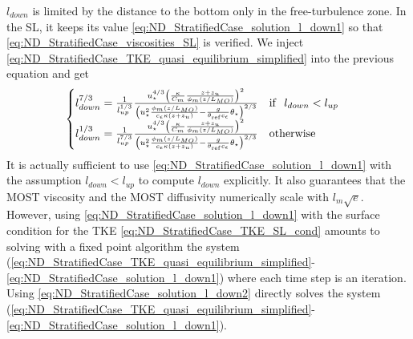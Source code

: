 $l_{down}$ is limited by the distance to the bottom only
in the free-turbulence zone. In the SL, it keeps its value
\eqref{eq:ND_StratifiedCase_solution_l_down1}
so that \eqref{eq:ND_StratifiedCase_viscosities_SL} is
verified.
We inject \eqref{eq:ND_StratifiedCase_TKE_quasi_equilibrium_simplified}
into the previous equation and get
\begin{equation}
	\label{eq:ND_StratifiedCase_solution_l_down2}
	\begin{cases}
	l_{down}^{7/3} = \frac{1}{l_{up}^{1/3}}
		\frac{u_\star^{4/3}\left(
	\frac{\kappa}{C_m}
	\frac{z + z_{u}}{\phi_m(z/L_{MO})}
	\right)^2}{
	\left({u}_\star^2
	\frac{\phi_m(z/L_{MO})}{c_\epsilon\kappa (z+z_{u})}
	- \frac{g}{\theta_{\rm ref}c_\epsilon}\theta_\star
	\right)^{2/3}} ~~~ {\rm if } ~~l_{down} < l_{up}\\
	l_{down}^{1/3} = \frac{1}{l_{up}^{7/3}}
		\frac{u_\star^{4/3}\left(
	\frac{\kappa}{C_m}
	\frac{z + z_{u}}{\phi_m(z/L_{MO})}
	\right)^2}{
	\left({u}_\star^2
	\frac{\phi_m(z/L_{MO})}{c_\epsilon\kappa (z+z_{u})}
	- \frac{g}{\theta_{\rm ref}c_\epsilon}\theta_\star
	\right)^{2/3}} ~~~ {\rm otherwise}\\
	\end{cases}
\end{equation}
It is actually sufficient to use
\eqref{eq:ND_StratifiedCase_solution_l_down1} with
the assumption $l_{down} < l_{up}$
to compute $l_{down}$ explicitly. It also guarantees that
the MOST viscosity and the MOST diffusivity numerically
scale with $l_m\sqrt{e}$.
However, using \eqref{eq:ND_StratifiedCase_solution_l_down1}
with the surface condition for the TKE
\eqref{eq:ND_StratifiedCase_TKE_SL_cond}
amounts to solving with a fixed point algorithm
the system
(\ref{eq:ND_StratifiedCase_TKE_quasi_equilibrium_simplified}-
\ref{eq:ND_StratifiedCase_solution_l_down1})
where each time step is an iteration.
Using \eqref{eq:ND_StratifiedCase_solution_l_down2}
directly solves the system
(\ref{eq:ND_StratifiedCase_TKE_quasi_equilibrium_simplified}-
\ref{eq:ND_StratifiedCase_solution_l_down1}).
